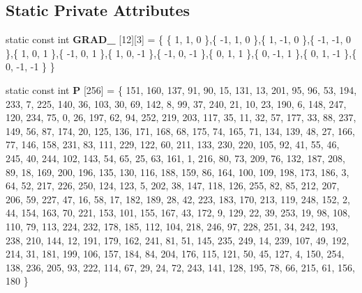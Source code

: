 \subsection*{Static Private Attributes}
\begin{DoxyCompactItemize}
\item 
\mbox{\label{classflounder_1_1noiseclassic_a0edf70f7d705f5ac98ca97f3e23dda3e}} 
static const int {\bfseries G\+R\+A\+D\+\_} \mbox{[}12\mbox{]}\mbox{[}3\mbox{]} = \{ \{ 1, 1, 0 \},\{ -\/1, 1, 0 \},\{ 1, -\/1, 0 \},\{ -\/1, -\/1, 0 \},\{ 1, 0, 1 \},\{ -\/1, 0, 1 \},\{ 1, 0, -\/1 \},\{ -\/1, 0, -\/1 \},\{ 0, 1, 1 \},\{ 0, -\/1, 1 \},\{ 0, 1, -\/1 \},\{ 0, -\/1, -\/1 \} \}
\item 
\mbox{\label{classflounder_1_1noiseclassic_a2c171d55b4c399d70f610fd2d9897987}} 
static const int {\bfseries P} \mbox{[}256\mbox{]} = \{ 151, 160, 137, 91, 90, 15, 131, 13, 201, 95, 96, 53, 194, 233, 7, 225, 140, 36, 103, 30, 69, 142, 8, 99, 37, 240, 21, 10, 23, 190, 6, 148, 247, 120, 234, 75, 0, 26, 197, 62, 94, 252, 219, 203, 117, 35, 11, 32, 57, 177, 33, 88, 237, 149, 56, 87, 174, 20, 125, 136, 171, 168, 68, 175, 74, 165, 71, 134, 139, 48, 27, 166, 77, 146, 158, 231, 83, 111, 229, 122, 60, 211, 133, 230, 220, 105, 92, 41, 55, 46, 245, 40, 244, 102, 143, 54, 65, 25, 63, 161, 1, 216, 80, 73, 209, 76, 132, 187, 208, 89, 18, 169, 200, 196, 135, 130, 116, 188, 159, 86, 164, 100, 109, 198, 173, 186, 3, 64, 52, 217, 226, 250, 124, 123, 5, 202, 38, 147, 118, 126, 255, 82, 85, 212, 207, 206, 59, 227, 47, 16, 58, 17, 182, 189, 28, 42, 223, 183, 170, 213, 119, 248, 152, 2, 44, 154, 163, 70, 221, 153, 101, 155, 167, 43, 172, 9, 129, 22, 39, 253, 19, 98, 108, 110, 79, 113, 224, 232, 178, 185, 112, 104, 218, 246, 97, 228, 251, 34, 242, 193, 238, 210, 144, 12, 191, 179, 162, 241, 81, 51, 145, 235, 249, 14, 239, 107, 49, 192, 214, 31, 181, 199, 106, 157, 184, 84, 204, 176, 115, 121, 50, 45, 127, 4, 150, 254, 138, 236, 205, 93, 222, 114, 67, 29, 24, 72, 243, 141, 128, 195, 78, 66, 215, 61, 156, 180 \}
\item 
\mbox{\label{classflounder_1_1noiseclassic_a796305eb36ef9dc61710bbfeddb0fd95}} 

\end{DoxyCompactItemize}
